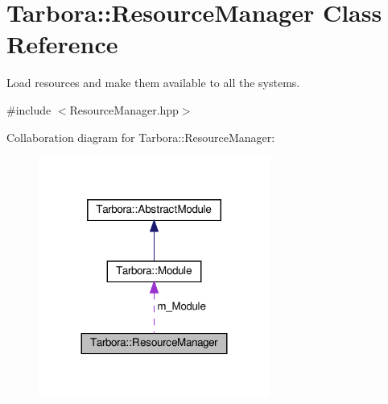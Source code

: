 \hypertarget{classTarbora_1_1ResourceManager}{}\section{Tarbora\+:\+:Resource\+Manager Class Reference}
\label{classTarbora_1_1ResourceManager}


Load resources and make them available to all the systems.  




{\ttfamily \#include $<$Resource\+Manager.\+hpp$>$}



Collaboration diagram for Tarbora\+:\+:Resource\+Manager\+:
\nopagebreak
\begin{figure}[H]
\begin{center}
\leavevmode
\includegraphics[width=215pt]{classTarbora_1_1ResourceManager__coll__graph}
\end{center}
\end{figure}

